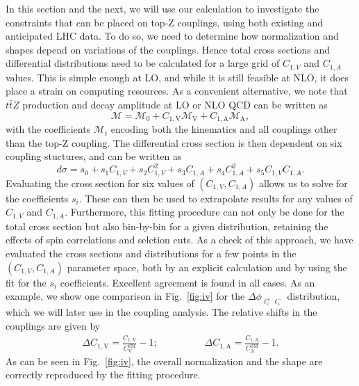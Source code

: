 \documentclass[preprint]{JHEP3}
\newcommand{\mrm}{\mathrm}
\def\ttbZ{t\bar{t}Z}
\def\ConeA{C_{1,\mathrm{A}}}
\def\ConeV{C_{1,\mathrm{V}}}
\def\ConeVSM{C_\mathrm{V}^{\mrm{SM}}}
\def\ConeASM{C_\mathrm{A}^{\mrm{SM}}}
\def\DConeA{\Delta C_{1,\mathrm{A}}}
\def\DConeV{\Delta C_{1,\mathrm{V}}}
\newcommand{\be}{\begin{eqnarray}}
\newcommand{\ee}{\end{eqnarray}}
\begin{document}
In this section and the next, we will use our calculation to investigate the constraints that can be placed on top-Z couplings, using both existing and anticipated LHC data. 
To do so, we need to determine how normalization and shapes depend on variations of the couplings. 
Hence total cross sections and differential distributions need to be calculated for a large grid of $C_{1,V}$ and $C_{1,A}$ values. 
This is simple enough at LO, and while it is still feasible at NLO, it does place a strain on computing resources. 
As a convenient alternative, we note that $\ttbZ$ production and decay amplitude at LO or NLO QCD can be written as
\begin{equation}
  \mathcal{M} = \mathcal{M}_0 +  \ConeV \mathcal{M}_\mathrm{V} +  \ConeA \mathcal{M}_\mathrm{A},
\end{equation}
with the coefficients $\mathcal{M}_i$ encoding both the kinematics and all couplings other than the top-Z coupling. 
The differential cross section is then dependent on six coupling stuctures, and can be written as
\begin{equation}
\label{couplfit}
  d\sigma = s_0 +s_1C_{1,V} + s_2C_{1,V}^2 +s_3 C_{1,A}+s_4C_{1,A}^2+s_5C_{1,V}C_{1,A}.
\end{equation}
Evaluating the cross section for six values of $(C_{1,V},C_{1,A})$ allows us to solve for the coefficients $s_i$. 
These can then be used to extrapolate results for any values of $C_{1,V}$ and $C_{1,A}$. 
Furthermore, this fitting procedure can not only be done for the total cross section but also bin-by-bin for a given distribution, 
retaining the effects of spin correlations and selction cuts.
As a check of this approach, we have evaluated the cross sections and distributions for a few points in the $(C_{1,V},C_{1,A})$ parameter space, 
both by an explicit calculation and by using the fit for the $s_i$ coefficients. Excellent agreement is found in all cases. 
As an example, we show one comparison in Fig.~\ref{fig:iv} for the  $\Delta \phi_{\ell^+_z \ell^-_z}$ distribution, which we will later use in the coupling analysis.
The relative shifts in the couplings are given by
\be
\DConeV =  \frac{\ConeV}{\ConeVSM}-1 ; \hspace{2cm} \DConeA = \frac{\ConeA}{\ConeASM}-1.
\ee
As can be seen in Fig.~\ref{fig:iv}, the overall normalization and the shape are correctly reproduced by the fitting procedure.
\end{document}

